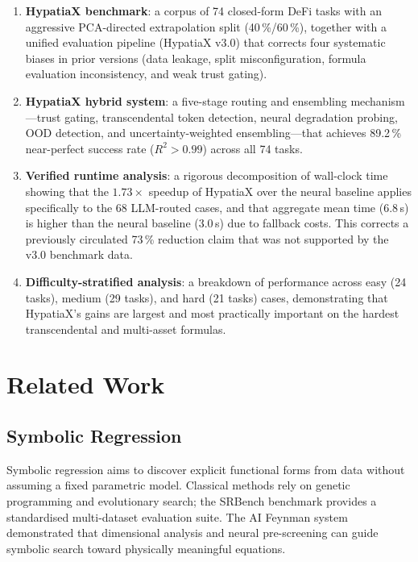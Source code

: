 \documentclass[twoside,11pt]{article}
\newcommand{\Rsq}{R^{2}}
\begin{document}
\begin{enumerate}[leftmargin=2em,label=(\roman*)]
  \item \textbf{HypatiaX benchmark}: a corpus of 74 closed-form DeFi tasks
    with an aggressive PCA-directed extrapolation split (40\,\%/60\,\%), together
    with a unified evaluation pipeline (HypatiaX v3.0) that corrects four
    systematic biases in prior versions (data leakage, split misconfiguration,
    formula evaluation inconsistency, and weak trust gating).

  \item \textbf{HypatiaX hybrid system}: a five-stage routing and ensembling
    mechanism---trust gating, transcendental token detection, neural degradation
    probing, OOD detection, and uncertainty-weighted ensembling---that achieves
    89.2\,\% near-perfect success rate ($\Rsq>0.99$) across all 74 tasks.

  \item \textbf{Verified runtime analysis}: a rigorous decomposition of wall-clock
    time showing that the $1.73\times$ speedup of HypatiaX over the neural baseline
    applies specifically to the 68 LLM-routed cases, and that aggregate mean time
    (6.8\,s) is higher than the neural baseline (3.0\,s) due to fallback costs.
    This corrects a previously circulated 73\,\% reduction claim that was not
    supported by the v3.0 benchmark data.

  \item \textbf{Difficulty-stratified analysis}: a breakdown of performance across
    easy (24 tasks), medium (29 tasks), and hard (21 tasks) cases, demonstrating
    that HypatiaX's gains are largest and most practically important on the hardest
    transcendental and multi-asset formulas.
\end{enumerate}

\section{Related Work}
\label{sec:related}

\subsection{Symbolic Regression}
\label{sec:related_sr}

Symbolic regression aims to discover explicit functional forms from data without
assuming a fixed parametric model.  Classical methods rely on genetic programming
\citep{koza1992genetic} and evolutionary search; the SRBench benchmark \citep{la2021contemporary}
provides a standardised multi-dataset evaluation suite.  The AI Feynman
system \citep{udrescu2020ai} demonstrated that dimensional analysis and neural
pre-screening can guide symbolic search toward physically meaningful equations.
\end{document}

